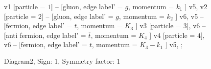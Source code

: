 \documentclass{revtex4}
\begin{document}
\begin{figure}[!htb]
\begin{center}
{    %
v1 [particle = \(1\)] -- [gluon, edge label' = \(g\), momentum = \(k_{1}\) ] v5, 
v2 [particle = \(2\)] -- [gluon, edge label' = \(g\), momentum = \(k_{2}\) ] v6, 
v5 -- [fermion, edge label' = \(t\), momentum = \(K_{3}\) ] v3 [particle = \(3\)], 
v6 -- [anti fermion, edge label' = \(\overline{t}\), momentum = \(K_{4}\) ] v4 [particle = \(4\)], 
v6 -- [fermion, edge label' = \(t\), momentum = \(K_{3} - k_{1}\) ] v5, 
};
\end{center}
\caption{Diagram2, Sign: 1, Symmetry factor: 1}
\end{figure}
\newpage
\end{document}
